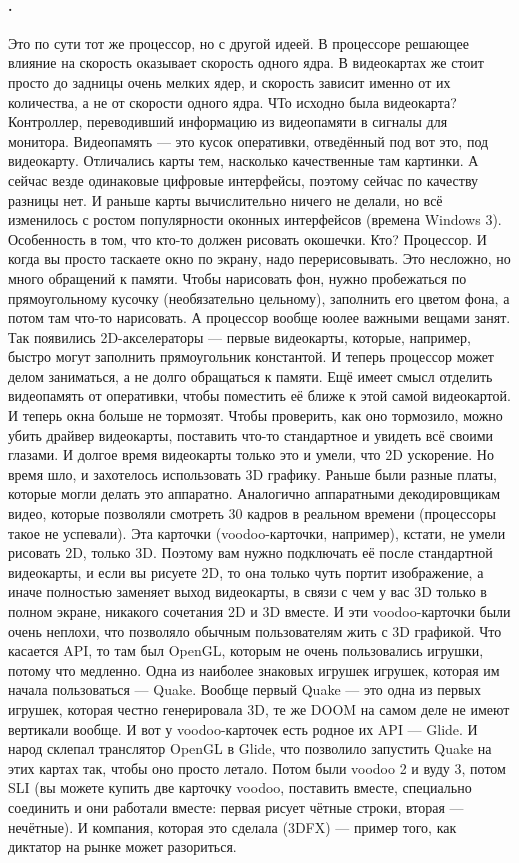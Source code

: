 \documentclass{article}
\begin{document}
    \paragraph{.}
    Это по сути тот же процессор, но с другой идеей. В процессоре решающее влияние на скорость оказывает скорость одного ядра. В видеокартах же стоит просто до задницы очень мелких ядер, и скорость зависит именно от их количества, а не от скорости одного ядра. ЧТо исходно была видеокарта? Контроллер, переводивший информацию из видеопамяти в сигналы для монитора. Видеопамять --- это кусок оперативки, отведённый под вот это, под видеокарту. Отличались карты тем, насколько качественные там картинки. А сейчас везде одинаковые цифровые интерфейсы, поэтому сейчас по качеству разницы нет. И раньше карты вычислительно ничего не делали, но всё изменилось с ростом популярности оконных интерфейсов (времена Windows 3). Особенность в том, что кто-то должен рисовать окошечки. Кто? Процессор. И когда вы просто таскаете окно по экрану, надо перерисовывать. Это несложно, но много обращений к памяти. Чтобы нарисовать фон, нужно пробежаться по прямоугольному кусочку (необязательно цельному), заполнить его цветом фона, а потом там что-то нарисовать. А процессор вообще юолее важными вещами занят. Так появились 2D-акселераторы --- первые видеокарты, которые, например, быстро могут заполнить прямоугольник константой. И теперь процессор может делом заниматься, а не долго обращаться к памяти. Ещё имеет смысл отделить видеопамять от оперативки, чтобы поместить её ближе к этой самой видеокартой. И теперь окна больше не тормозят. Чтобы проверить, как оно тормозило, можно убить драйвер видеокарты, поставить что-то стандартное и увидеть всё своими глазами. И долгое время видеокарты только это и умели, что 2D ускорение. Но время шло, и захотелось использовать 3D графику. Раньше были разные платы, которые могли делать это аппаратно. Аналогично аппаратными декодировщикам видео, которые позволяли смотреть 30 кадров в реальном времени (процессоры такое не успевали). Эта карточки (voodoo-карточки, например), кстати, не умели рисовать 2D, только 3D. Поэтому вам нужно подключать её после стандартной видеокарты, и если вы рисуете 2D, то она только чуть портит изображение, а иначе полностью заменяет выход видеокарты, в связи с чем у вас 3D только в полном экране, никакого сочетания 2D и 3D вместе. И эти voodoo-карточки были очень неплохи, что позволяло обычным пользователям жить с 3D графикой. Что касается API, то там был OpenGL, которым не очень пользовались игрушки, потому что медленно. Одна из наиболее знаковых игрушек игрушек, которая им начала пользоваться --- Quake. Вообще первый Quake --- это одна из первых игрушек, которая честно генерировала 3D, те же DOOM на самом деле не имеют вертикали вообще. И вот у voodoo-карточек есть родное их API --- Glide. И народ склепал транслятор OpenGL в Glide, что позволило запустить Quake на этих картах так, чтобы оно просто летало. Потом были voodoo 2 и вуду 3, потом SLI (вы можете купить две карточку voodoo, поставить вместе, специально соединить и они работали вместе: первая рисует чётные строки, вторая --- нечётные). И компания, которая это сделала (3DFX) --- пример того, как диктатор на рынке может разориться. 
\end{document}
